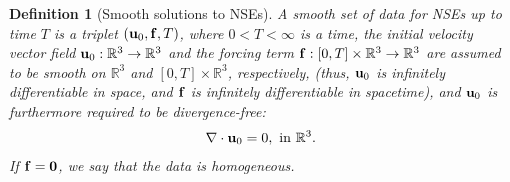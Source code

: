 \documentclass{article}
\numberwithin{equation}{section}
\newtheorem{definition}{Definition}[section]
\begin{document}
\begin{definition}[Smooth solutions to NSEs]
	A \emph{smooth set of data} for NSEs up to time $T$ is a triplet $({\bf u}_0,{\bf f},T)$, where $0 < T < \infty$ is a time, the initial velocity vector field ${\bf u}_0:\mathbb{R}^3\to\mathbb{R}^3$ and the forcing term ${\bf f}:[0,T]\times\mathbb{R}^3\to\mathbb{R}^3$ are assumed to be smooth on $\mathbb{R}^3$ and $[0,T]\times\mathbb{R}^3$, respectively, (thus, ${\bf u}_0$ is infinitely differentiable in space, and ${\bf f}$ is infinitely differentiable in spacetime), and ${\bf u}_0$ is furthermore required to be divergence-free:
	\begin{align}
		\label{divergence-free initial velocity}
		\nabla\cdot{\bf u}_0 = 0,\mbox{ in }\mathbb{R}^3.
	\end{align}
	If ${\bf f} = {\bf 0}$, we say that the data is \emph{homogeneous}.
	

\end{definition}
\end{document}
